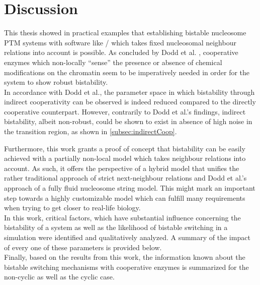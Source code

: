 \chapter{Discussion}
    \label{cha:discussion}

    This thesis showed in practical examples that establishing bistable nucleosome PTM systems with software like \ed/ which takes fixed nucleosomal neighbour relations into account is possible. As concluded by Dodd et al. \cite{dodd2007theoretical}, cooperative enzymes which non-locally “sense” the presence or absence of chemical modifications on the chromatin seem to be imperatively needed in order for the system to show robust bistability.\\

    In accordance with Dodd et al., the parameter space in which bistability through indirect cooperativity can be observed is indeed reduced compared to the directly cooperative counterpart. However, contrarily to Dodd et al.'s findings, indirect bistability, albeit non-robust, could be shown to exist in absence of high noise in the transition region, as shown in \ref{subsec:indirectCoop}.

    Furthermore, this work grants a proof of concept that bistability can be easily achieved with a partially non-local model which takes neighbour relations into account. As such, it offers the perspective of a hybrid model that unifies the rather traditional approach of strict next-neighbour relations and Dodd et al.'s approach of a fully fluid nucleosome string model. This might mark an important step towards a highly customizable model which can fulfill many requirements when trying to get closer to real-life biology.\\

    In this work, critical factors, which have substantial influence concerning the bistability of a system as well as the likelihood of bistable switching in a simulation were identified and qualitatively analyzed. A summary of the impact of every one of these parameters is provided below.\\


    Finally, based on the results from this work, the information known about the bistable switching mechanisms with cooperative enzymes is summarized for the non-cyclic as well as the cyclic case.


